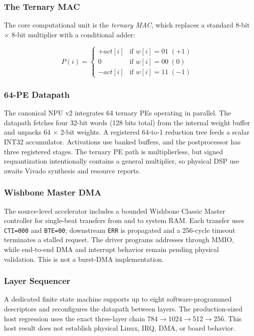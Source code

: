 \documentclass[10pt,conference]{IEEEtran}
\begin{document}
\subsubsection*{The Ternary MAC}
The core computational unit is the \textit{ternary MAC}, which replaces a standard $8$-bit $\times$ $8$-bit multiplier with a conditional adder:

\begin{equation}
P(i) = 
\begin{cases}
+act[i] & \text{if } w[i] = 01\;(+1) \\
0       & \text{if } w[i] = 00\;(0) \\
-act[i] & \text{if } w[i] = 11\;(-1)
\end{cases}
\end{equation}

\subsubsection*{64-PE Datapath}
The canonical NPU v2 integrates 64 ternary PEs operating in parallel. The datapath fetches four 32-bit words (128 bits total) from the internal weight buffer and unpacks 64 $\times$ 2-bit weights. A registered 64-to-1 reduction tree feeds a scalar INT32 accumulator. Activations use banked buffers, and the postprocessor has three registered stages. The ternary PE path is multiplierless, but signed requantization intentionally contains a general multiplier, so physical DSP use awaits Vivado synthesis and resource reports.

\subsubsection*{Wishbone Master DMA}
The source-level accelerator includes a bounded Wishbone Classic Master controller for single-beat transfers from and to system RAM. Each transfer uses \texttt{CTI=000} and \texttt{BTE=00}; downstream \texttt{ERR} is propagated and a 256-cycle timeout terminates a stalled request. The driver programs addresses through MMIO, while end-to-end DMA and interrupt behavior remain pending physical validation. This is not a burst-DMA implementation.

\subsubsection*{Layer Sequencer}
A dedicated finite state machine supports up to eight software-programmed descriptors and reconfigures the datapath between layers. The production-sized host regression uses the exact three-layer chain 784$\to$1024$\to$512$\to$256. This host result does not establish physical Linux, IRQ, DMA, or board behavior.
\end{document}

